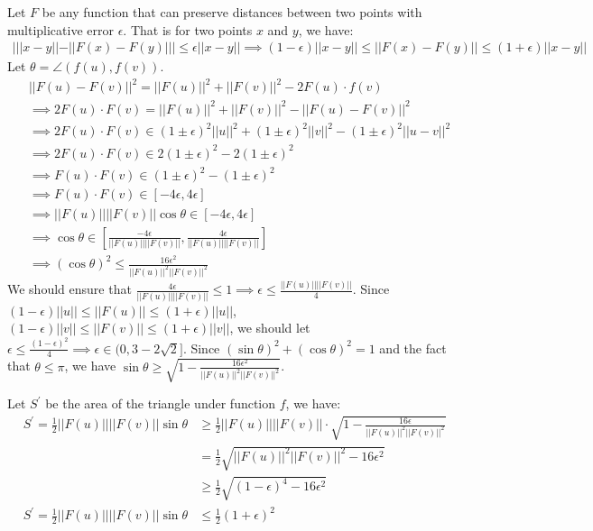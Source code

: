 Let $F$ be any function that can preserve distances between two points with multiplicative error $\epsilon$.
That is for two points $x$ and $y$, we have:
\begin{align}
    \nonumber |||x-y||-||F(x)-F(y)||| \le \epsilon ||x-y|| \implies
    (1-\epsilon)||x-y||\le||F(x)-F(y)||\le(1+\epsilon)||x-y||
\end{align}
Let $\theta=\angle(f(u),f(v))$.
\begin{align}
    \nonumber &||F(u)-F(v)||^2=||F(u)||^2+||F(v)||^2-2F(u)\cdot f(v)\\
    \nonumber &\implies 2 F(u)\cdot F(v) =||F(u)||^2+||F(v)||^2-||F(u)-F(v)||^2\\
    \nonumber &\implies 2 F(u)\cdot F(v)\in (1\pm\epsilon)^2||u||^2+(1\pm\epsilon)^2||v||^2-(1\pm \epsilon)^2||u-v||^2\\
    \nonumber &\implies 2 F(u)\cdot F(v)\in  2(1\pm\epsilon)^2-2(1\pm \epsilon)^2\\
    \nonumber &\implies F(u)\cdot F(v)\in (1\pm\epsilon)^2-(1\pm \epsilon)^2\\
    \nonumber &\implies F(u)\cdot F(v) \in [-4\epsilon,4\epsilon]\\
    \nonumber &\implies ||F(u)||||F(v)|| \cos \theta \in [-4\epsilon,4\epsilon]\\
    \nonumber &\implies \cos \theta \in \left[\frac{-4\epsilon}{||F(u)||||F(v)||},\frac{4\epsilon}{||F(u)||||F(v)||}\right]\\
    \nonumber &\implies (\cos \theta)^2 \le \frac{16\epsilon^2}{||F(u)||^2||F(v)||^2}
\end{align}
We should ensure that $\frac{4\epsilon}{||F(u)||||F(v)||}\le1 \implies \epsilon \le \frac{||F(u)||||F(v)||}{4}$.
Since $(1-\epsilon) ||u||\le||F(u)||\le (1+\epsilon) ||u||$, $(1-\epsilon) ||v||\le||F(v)||\le (1+\epsilon) ||v||$,
we should let $ \epsilon \le \frac{(1-\epsilon)^2}{4}\implies \epsilon \in (0,3-2\sqrt{2}]$.
Since $(\sin\theta)^2+(\cos\theta)^2=1$ and the fact that $\theta\le\pi$, we have $\sin\theta \ge \sqrt{1-\frac{16\epsilon^2}{||F(u)||^2||F(v)||^2}}$.

Let $S^{\prime}$ be the area of the triangle under function $f$, we have:
\begin{align}
    \nonumber S^{\prime}=\frac{1}{2}||F(u)||||F(v)||\sin\theta &\ge \frac{1}{2}||F(u)||||F(v)||\cdot \sqrt{1-\frac{16\epsilon}{||F(u)||^2||F(v)||^2}}\\
    \nonumber &=\frac{1}{2}\sqrt{||F(u)||^2||F(v)||^2-16\epsilon^2}\\
    \nonumber &\ge \frac{1}{2}\sqrt{(1-\epsilon)^4-16\epsilon^2}\\
    \nonumber S^{\prime}=\frac{1}{2}||F(u)||||F(v)||\sin\theta &\le \frac{1}{2}(1+\epsilon)^2
\end{align}


